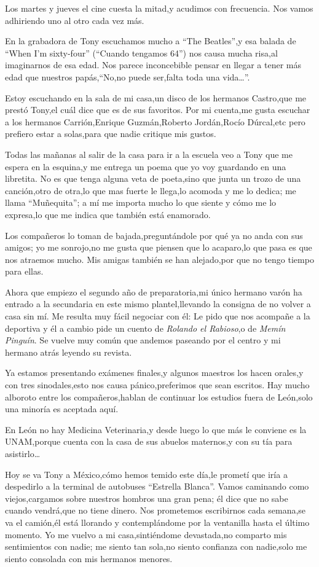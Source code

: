 \documentclass[letterpaper,12pt]{book}
\begin{document}
Los martes y jueves el cine cuesta la mitad,y acudimos con frecuencia. Nos vamos adhiriendo uno al otro cada vez más.

En la grabadora de Tony escuchamos mucho a ``The Beatles'',y esa balada de ``When I'm sixty-four'' (``Cuando tengamos 64'') nos causa mucha risa,al imaginarnos de esa edad. Nos parece inconcebible pensar en llegar a tener más edad que nuestros papás,``No,no puede ser,falta toda una vida\ldots''.

Estoy escuchando en la sala de mi casa,un disco de los hermanos Castro,que me prestó Tony,el cuál dice que es de sus favoritos. Por mi cuenta,me gusta escuchar a los hermanos Carrión,Enrique Guzmán,Roberto Jordán,Rocío Dúrcal,etc pero prefiero estar a solas,para que nadie critique mis gustos.

Todas las mañanas al salir de la casa para ir a la escuela veo a Tony que me espera en la esquina,y me entrega un poema que yo voy guardando en una libretita. No es que tenga alguna veta de poeta,sino que junta un trozo de una canción,otro de otra,lo que mas fuerte le llega,lo acomoda y me lo dedica; me llama ``Muñequita''; a mí me importa mucho lo que siente y cómo me lo expresa,lo que me indica que también está enamorado.

Los compañeros lo toman de bajada,preguntándole por qué ya no anda con sus amigos; yo me sonrojo,no me gusta que piensen que lo acaparo,lo que pasa es que nos atraemos mucho. Mis amigas también se han alejado,por que no tengo tiempo para ellas. 

Ahora que empiezo el segundo año de preparatoria,mi único hermano varón ha entrado a la secundaria en este mismo plantel,llevando la consigna de no volver a casa sin mí. Me resulta muy fácil negociar con él: Le pido que nos acompañe a la deportiva y él a cambio pide un cuento de {\it Rolando el Rabioso},o de {\it Memín Pinguín}. Se vuelve muy común que andemos paseando por el centro y mi hermano atrás leyendo su revista.


Ya estamos presentando exámenes finales,y algunos maestros los hacen orales,y con tres sinodales,esto nos causa pánico,preferimos que sean escritos. Hay mucho alboroto entre los compañeros,hablan de continuar los estudios fuera de León,solo una minoría es aceptada aquí.

En León no hay Medicina Veterinaria,y desde luego lo que más le conviene es la UNAM,porque cuenta con la casa de sus abuelos maternos,y con su tía para asistirlo\ldots

Hoy se va Tony a México,cómo hemos temido este día,le prometí que iría a despedirlo a la terminal de autobuses ``Estrella Blanca''. Vamos caminando como viejos,cargamos sobre nuestros hombros una gran pena; él dice que no sabe cuando vendrá,que no tiene dinero. Nos prometemos escribirnos cada semana,se va el camión,él está llorando y contemplándome por la ventanilla hasta el último momento. Yo me vuelvo a mi casa,sintiéndome devastada,no comparto mis sentimientos con nadie; me siento tan sola,no siento confianza con nadie,solo me siento consolada con mis hermanos menores. 
\end{document}
